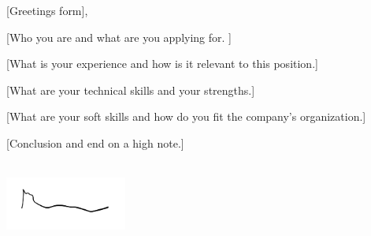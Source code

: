 \documentclass{cover}
\begin{document}
	
%
%

\maketitle

%
%
\subjectline	%

[Greetings form], 

[Who you are and what are you applying for.
\vspace*{2\parsep}]

[What is your experience and how is it relevant to this position.\vspace*{5\parsep}]

[What are your technical skills and your strengths.\vspace*{5\parsep}]

[What are your soft skills and how do you fit the company's organization.\vspace*{3\parsep}]

[Conclusion and end on a high note.\vspace*{2\parsep}]

\begin{flushright}
	\\
	\includegraphics[width=4cm]{./images/signature.png}
\end{flushright}

		
\end{document}
